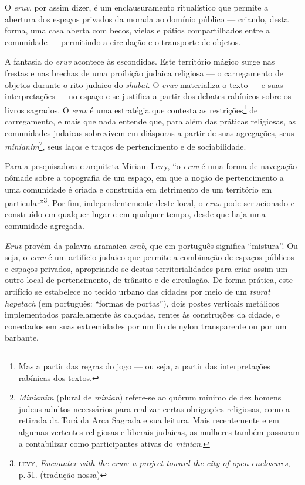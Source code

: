 O \emph{eruv}, por assim dizer, é um enclausuramento ritualístico que
permite a abertura dos espaços privados da morada ao domínio público ---
criando, desta forma, uma casa aberta com becos, vielas e pátios
compartilhados entre a comunidade --- permitindo a circulação e o
transporte de objetos.

A fantasia do \emph{eruv} acontece às escondidas. Este território mágico
surge nas frestas e nas brechas de uma proibição judaica religiosa --- o
carregamento de objetos durante o rito judaico do \emph{shabat}. O
\emph{eruv} materializa o texto --- e suas interpretações --- no espaço
e se justifica a partir dos debates rabínicos sobre os livros sagrados.
O \emph{eruv} é uma estratégia que contesta as restrições\footnote{Mas a
  partir das regras do jogo --- ou seja, a partir das interpretações
  rabínicas dos textos.} de carregamento, e mais que nada entende que,
para além das práticas religiosas, as comunidades judaicas sobrevivem em
diásporas a partir de suas agregações, seus \emph{minianim}\footnote{\emph{Minianim}
  (plural de \emph{minian}) refere-se ao quórum mínimo de dez homens
  judeus adultos necessários para realizar certas obrigações religiosas,
  como a retirada da Torá da Arca Sagrada e sua leitura. Mais
  recentemente e em algumas vertentes religiosas e liberais judaicas, as
  mulheres também passaram a contabilizar como participantes ativas do
  \emph{minian}.}, seus laços e traços de pertencimento e de
sociabilidade.

Para a pesquisadora e arquiteta Miriam Levy, ``o \emph{eruv} é uma forma
de navegação nômade sobre a topografia de um espaço, em que a noção de
pertencimento a uma comunidade é criada e construída em detrimento de um
território em particular''\footnote{\textsc{levy}, \emph{Encounter with the
  \emph{eruv}: a project toward the city of open enclosures}, p.\,51. (tradução
  nossa)}. Por fim, independentemente deste local, o \emph{eruv} pode
ser acionado e construído em qualquer lugar e em qualquer tempo, desde
que haja uma comunidade agregada.

\begin{center}\end{center}

\noindent{}\emph{Eruv} provém da palavra aramaica \emph{arab}, que em português
significa ``mistura''. Ou seja, o \emph{eruv} é um artifício judaico que
permite a combinação de espaços públicos e espaços privados,
apropriando-se destas territorialidades para criar assim um outro local
de pertencimento, de trânsito e de circulação. De forma prática, este
artifício se estabelece no tecido urbano das cidades por meio de um
\emph{tsurat hapetach} (em português: ``formas de portas''), dois postes
verticais metálicos implementados paralelamente às calçadas, rentes às
construções da cidade, e conectados em suas extremidades por um fio de
nylon transparente ou por um barbante.

